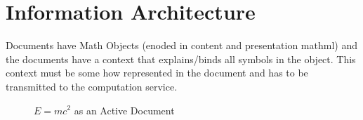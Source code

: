 \section{Information Architecture}\label{sec:infarch}

Documents have Math Objects (enoded in content and presentation mathml) and the documents have a
context 
that explains/binds all symbols in the object. This context must be some how represented
in the document and has to be transmitted to the computation service.


\begin{figure}\centering
  {\footnotesize}
  \caption{$E=mc^2$ as an Active Document}\label{fig:emc-adp}
\end{figure}

